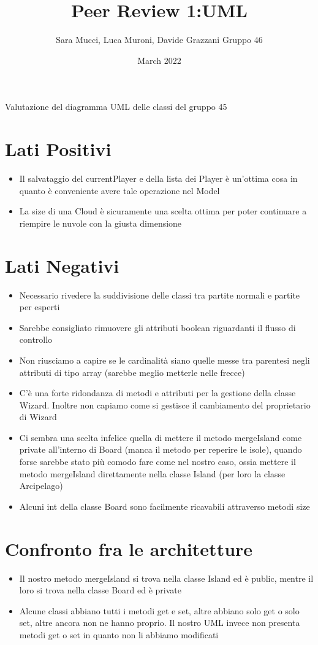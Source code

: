 \documentclass{article}
\title{Peer Review 1:UML}
\author{Sara Mucci, Luca Muroni, Davide Grazzani Gruppo 46}
\date{March 2022}
\begin{document}
\maketitle
Valutazione del diagramma UML delle classi del gruppo 45

\section{Lati Positivi}
\begin{itemize}
  \item Il salvataggio del currentPlayer e della lista dei Player è un'ottima cosa in quanto è conveniente avere tale operazione nel Model 
  \item La size di una Cloud è sicuramente una scelta ottima per poter continuare a riempire le nuvole con la giusta dimensione
 \end{itemize}
\section{Lati Negativi}

\begin{itemize}
  \item Necessario rivedere la suddivisione delle classi tra partite normali e partite per esperti
  \item Sarebbe consigliato rimuovere gli attributi boolean riguardanti il flusso di controllo
  \item Non riusciamo a capire se le cardinalità siano quelle messe tra parentesi negli attributi di tipo array (sarebbe meglio metterle nelle frecce)
  \item C'è una forte ridondanza di metodi e attributi per la gestione della classe Wizard. Inoltre non capiamo come si gestisce il cambiamento del proprietario di Wizard
  \item Ci sembra una scelta infelice quella di mettere il metodo mergeIsland come private all'interno di Board (manca il metodo per reperire le isole), quando forse sarebbe stato più comodo fare come nel nostro caso, ossia mettere il metodo mergeIsland direttamente nella classe Island (per loro la classe Arcipelago)
  \item Alcuni int della classe Board sono facilmente ricavabili attraverso metodi size
\end{itemize}

\section{Confronto fra le architetture}
\begin{itemize}
  \item Il nostro metodo mergeIsland si trova nella classe Island ed è public, mentre il loro si trova nella classe Board ed è private 
  \item Alcune classi abbiano tutti i metodi get e set, altre abbiano solo get o solo set, altre ancora non ne hanno proprio. Il nostro UML invece non presenta metodi get o set in quanto non li abbiamo modificati
\end{itemize}
\end{document}
